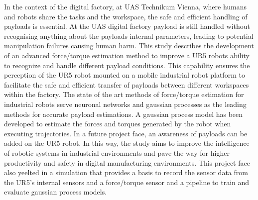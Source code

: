     {
    In the context of the digital factory, at UAS Technikum Vienna, where humans and robots share the tasks and the workspace, 
    the safe and efficient handling of payloads is essential. At the UAS digital factory payload is still handled without recognising 
    anything about the payloads internal parameters, leading to potential manipulation failures causing human harm. This study describes 
    the development of an advanced force/torque estimation method to improve a UR5 robots ability to recognize and handle different payload conditions. 
    This capability ensures the perception of the UR5 robot mounted on a mobile industrial robot platform to facilitate the safe and efficient transfer
    of payloads between different workspaces within the factory. The state of the art methods of force/torque estimation for industrial robots serve 
    neuronal networks and gaussian processes as the leading methods for accurate payload estimations. A gaussian process model has been developed to 
    estimate the forces and torques generated by the robot when executing trajectories. In a future project face, an awareness of payloads can be added 
    on the UR5 robot. In this way, the study aims to improve the intelligence of robotic systems in industrial environments and pave the way for higher 
    productivity and safety in digital manufacturing environments. This project face also yeelted in a simulation that provides a basis to record the 
    sensor data from the UR5's internal sensors and a force/torque sensor and a pipeline to train and evaluate  gaussian process models.
    }